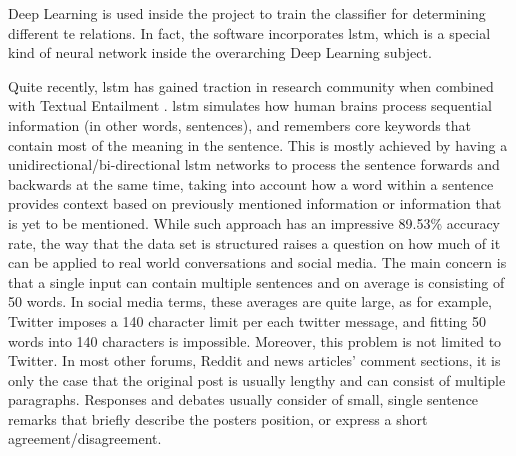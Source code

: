         Deep Learning is used inside the project to train the classifier for determining different \gls{te} relations. In fact, the software incorporates \gls{lstm}, which is a special kind of neural network inside the overarching Deep Learning subject.
            
        Quite recently, \gls{lstm} has gained traction in research community when combined with Textual Entailment \autocite{Cocarascu2017IdentifyingAA}. \gls{lstm} simulates how human brains process sequential information (in other words, sentences), and remembers core keywords that contain most of the meaning in the sentence. This is mostly achieved by having a unidirectional/bi-directional \gls{lstm} networks to process the sentence forwards and backwards at the same time, taking into account how a word within a sentence provides context based on previously mentioned information or information that is yet to be mentioned. While such approach has an impressive 89.53\% accuracy rate, the way that the data set is structured raises a question on how much of it can be applied to real world conversations and social media. The main concern is that a single input can contain multiple sentences and on average is consisting of 50 words. In social media terms, these averages are quite large, as for example, Twitter imposes a 140 character limit per each twitter message, and fitting 50 words into 140 characters is impossible. Moreover, this problem is not limited to Twitter. In most other forums, Reddit and news articles' comment sections, it is only the case that the original post is usually lengthy and can consist of multiple paragraphs. Responses and debates usually consider of small, single sentence remarks that briefly describe the posters position, or express a short agreement/disagreement.